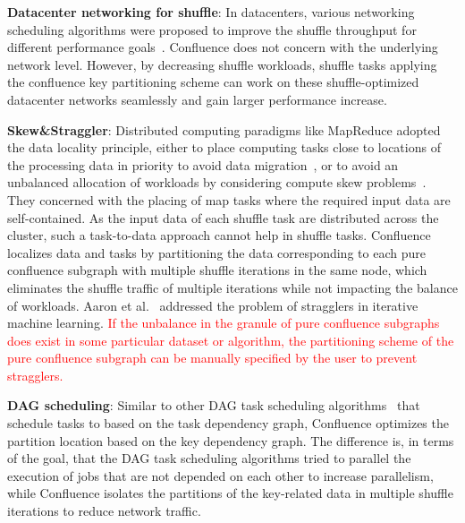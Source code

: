 \documentclass[10pt,journal,compsoc]{IEEEtran}
\newcommand{\red}[1]{\textcolor{red}{#1}}
\begin{document}
\textbf{Datacenter networking for shuffle}: 
In datacenters, various networking scheduling algorithms were proposed to improve the shuffle throughput for different performance goals~\cite{greenberg2009vl2,popa2012faircloud,shieh2011sharing,chowdhury2011managing}.  
Confluence does not concern with the underlying network level. However, by decreasing shuffle workloads, shuffle tasks applying the confluence key partitioning scheme can work on these shuffle-optimized datacenter networks seamlessly and gain larger performance increase.    

\textbf{Skew\&Straggler}: 
Distributed computing paradigms like MapReduce adopted the data locality principle, either to place computing tasks close to locations of the processing data in priority to avoid data migration~\cite{dean2008mapreduce, zaharia2008improving}, or to avoid an unbalanced allocation of workloads by considering compute skew problems~\cite{kwon2010skew, kwon2012skewtune}. 
They concerned with the placing of map tasks where the required input data are self-contained.
As the input data of each shuffle task are distributed across the cluster, such a task-to-data approach cannot help in shuffle tasks. 
Confluence localizes data and tasks by partitioning the data corresponding to each pure confluence subgraph with multiple shuffle iterations in the same node, which eliminates the shuffle traffic of multiple iterations while not impacting the balance of workloads.
Aaron et al.~\cite{Harlap:2016:ASP} addressed the problem of stragglers in iterative machine learning. \red{If the unbalance in the granule of pure confluence subgraphs does exist in some particular dataset or algorithm, the partitioning scheme of the pure confluence subgraph can be manually specified by the user to prevent stragglers.} 

\textbf{DAG scheduling}: 
Similar to other DAG task scheduling algorithms~\cite{sakellariou2004hybrid, zhao2006scheduling, spark-dagscheduler, isard2007dryad} that schedule tasks to based on the task dependency graph, Confluence optimizes the partition location based on the key dependency graph. 
The difference is, in terms of the goal, that the DAG task scheduling algorithms tried to parallel the execution of jobs that are not depended on each other to increase parallelism, while Confluence isolates the partitions of the key-related data in multiple shuffle iterations to reduce network traffic. 
\end{document}
